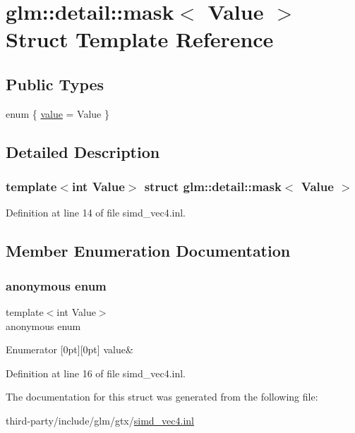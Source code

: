 \hypertarget{structglm_1_1detail_1_1mask}{}\section{glm\+:\+:detail\+:\+:mask$<$ Value $>$ Struct Template Reference}
\label{structglm_1_1detail_1_1mask}
\subsection*{Public Types}
\begin{DoxyCompactItemize}
\item 
enum \{ \hyperlink{structglm_1_1detail_1_1mask_a7e040bfc03e224f60bfd38e56aa7fd1bacee1a8171c8a228f27a38bf153821352}{value} = Value
 \}
\end{DoxyCompactItemize}


\subsection{Detailed Description}
\subsubsection*{template$<$int Value$>$\newline
struct glm\+::detail\+::mask$<$ Value $>$}



Definition at line 14 of file simd\+\_\+vec4.\+inl.



\subsection{Member Enumeration Documentation}
\mbox{\label{structglm_1_1detail_1_1mask_a7e040bfc03e224f60bfd38e56aa7fd1b}} 
\subsubsection{\texorpdfstring{anonymous enum}{anonymous enum}}
{\footnotesize\ttfamily template$<$int Value$>$ \\
anonymous enum}

\begin{DoxyEnumFields}{Enumerator}
[0pt][0pt]{}\mbox{\label{structglm_1_1detail_1_1mask_a7e040bfc03e224f60bfd38e56aa7fd1bacee1a8171c8a228f27a38bf153821352}} 
value&\\
\hline

\end{DoxyEnumFields}


Definition at line 16 of file simd\+\_\+vec4.\+inl.



The documentation for this struct was generated from the following file\+:\begin{DoxyCompactItemize}
\item 
third-\/party/include/glm/gtx/\hyperlink{simd__vec4_8inl}{simd\+\_\+vec4.\+inl}\end{DoxyCompactItemize}

